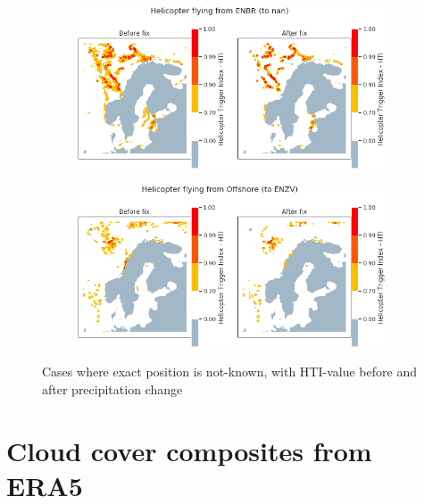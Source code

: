 \begin{figure}[H]
    \begin{subfigure}{0.45\textwidth}
    \centering
    \includegraphics[width=\textwidth]{Figures/Analysis04.png}
    \caption{}
    \label{fig:HTIA04}
    \end{subfigure}
\hfill
    \begin{subfigure}{0.45\textwidth}
    \centering
    \includegraphics[width=\textwidth]{Figures/Analysis05.png}
    \caption{}
    \label{fig:HTIA05}
    \end{subfigure}
\caption{Cases where exact position is not-known, with HTI-value before and after precipitation change}

\end{figure}

\section{Cloud cover composites from ERA5}

